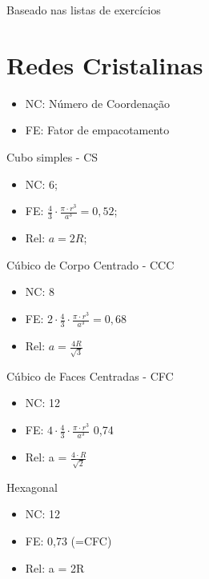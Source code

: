 {\normalsize Baseado nas listas de exercícios}

\section{Redes Cristalinas}


\begin{itemize}
	\setlength{\parskip}{0pt}
	\setlength{\itemsep}{0pt plus 1pt}
	
	\item NC: Número de Coordenação
	\item FE: Fator de empacotamento
\end{itemize}


Cubo simples - CS




\begin{itemize}
	\item NC: 6;
	\item FE: $\frac{4}{3} \cdot \frac{\pi \cdot r^{3}}{a^{3}} = 0,52$;
	\item Rel: $a = 2R$;	
\end{itemize}


Cúbico de Corpo Centrado - CCC

\begin{itemize}
	\item NC: 8
	\item FE: $2 \cdot \frac{4}{3} \cdot \frac{\pi \cdot r^{3}}{a^{3}} = 0,68$
	\item Rel: $a = \frac{4R}{\sqrt{3}}$
\end{itemize}


Cúbico de Faces Centradas - CFC

\begin{itemize}
	\setlength{\parskip}{0pt}
	\setlength{\itemsep}{0pt plus 1pt}
	
	\item NC: 12
	\item FE: $4 \cdot \frac{4}{3} \cdot \frac{\pi \cdot r^{3}}{a^{3}}$ 0,74
	\item Rel: a = $\frac{4 \cdot R}{\sqrt{2}}$
\end{itemize}

Hexagonal

\begin{itemize}
	
	\setlength{\parskip}{0pt}
	\setlength{\itemsep}{0pt plus 1pt}
	
	\item NC: 12
	\item FE: 0,73 (=CFC)
	\item Rel: a = 2R
\end{itemize}


